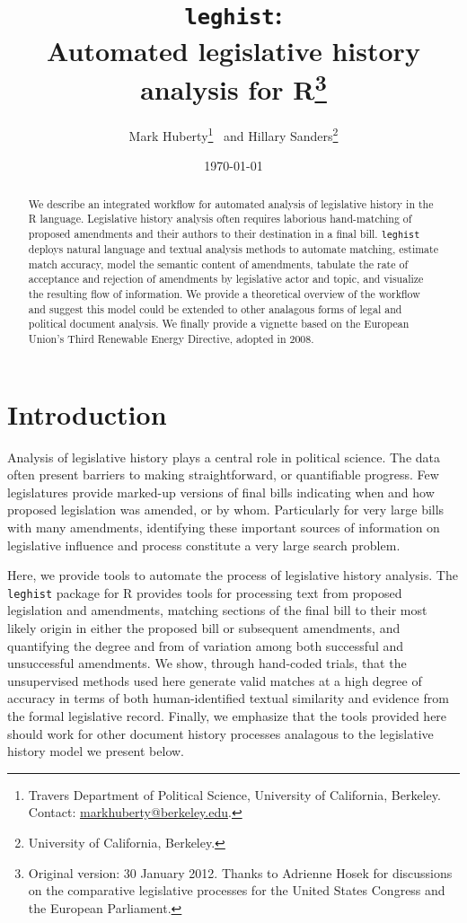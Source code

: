 \documentclass[11pt]{article}
\title{\texttt{leghist}:\\ Automated legislative history analysis for
  R\thanks{Original version: 30 January 2012. Thanks to Adrienne Hosek for discussions on the
  comparative legislative processes for the United States Congress and
the European Parliament.}}
\author{Mark Huberty\thanks{Travers Department of Political Science,
    University of California, Berkeley. Contact:
    \url{markhuberty@berkeley.edu}.}~ and Hillary Sanders\thanks{University of
California, Berkeley.}}
\date{\today}
\begin{document}
%
\maketitle

\begin{abstract}
  We describe an integrated workflow for automated analysis of
  legislative history in the R language. Legislative history analysis
  often requires laborious hand-matching of proposed amendments and
  their authors to their destination in a final bill. \texttt{leghist}
  deploys natural language and textual analysis methods to automate
  matching, estimate match accuracy, model the
  semantic content of amendments, tabulate the rate of acceptance and
  rejection of amendments by legislative actor and topic, and visualize the
  resulting flow of information. We provide a theoretical
  overview of the workflow and suggest this model could be extended to
  other analagous forms of legal and political document analysis. We
  finally provide a vignette based on the European Union's Third
  Renewable Energy Directive, adopted in 2008. 
\end{abstract}

\section{Introduction}
\label{sec:introduction}

Analysis of legislative history plays a central role in political
science. The data often present barriers to making straightforward, or
quantifiable progress. Few legislatures provide marked-up versions of final bills
indicating when and how proposed legislation was amended, or by
whom. Particularly for very large bills with many amendments,
identifying these important sources of information on legislative
influence and process constitute a very large search problem. 

Here, we provide tools to automate the process of legislative history
analysis. The \texttt{leghist} package for R provides tools for
processing text from proposed legislation and amendments, matching
sections of the final bill to their most likely origin in either the
proposed bill or subsequent amendments, and quantifying the degree and
from of variation among both successful and unsuccessful
amendments. We show, through hand-coded trials, that the unsupervised
methods used here generate valid matches at a high degree of accuracy
in terms of both human-identified textual similarity and evidence from
the formal legislative record. Finally, we emphasize that the tools
provided here should work for other document history processes
analagous to the legislative history model we present below.
\end{document}
